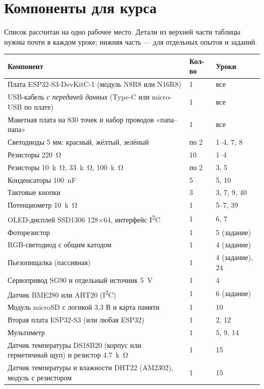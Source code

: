 \section{Компоненты для курса}
Список рассчитан на одно рабочее место. Детали из верхней части таблицы нужны почти в каждом уроке;
нижняя часть --- для отдельных опытов и заданий.

{\small
\begin{xltabular}{\textwidth}{@{}X l l@{}}
\toprule
Компонент & Кол-во & Уроки \\
\midrule
Плата ESP32-S3-DevKitC-1 (модуль N8R8 или N16R8) & 1 & все \\
USB-кабель \emph{с передачей данных} (Type-C или micro-USB по плате) & 1 & все \\
Макетная плата на 830 точек и набор проводов «папа--папа» & 1 & все \\
Светодиоды 5 мм: красный, жёлтый, зелёный & по 2 & 1--4, 7, 8 \\
Резисторы \SI{220}{\ohm} & 10 & 1--4 \\
Резисторы \SI{10}{k\ohm}, \SI{33}{k\ohm}, \SI{100}{k\ohm} & по 2 & 3, 5 \\
Конденсаторы \SI{100}{nF} & 5 & 5, 10 \\
Тактовые кнопки & 3 & 3, 7, 9, 40 \\
Потенциометр \SI{10}{k\ohm} & 1 & 5--7, 39 \\
OLED-дисплей SSD1306 128×64, интерфейс I\textsuperscript{2}C & 1 & 6, 7 \\
\midrule
Фоторезистор & 1 & 5 (задание) \\
RGB-светодиод с общим катодом & 1 & 4 (задание) \\
Пьезопищалка (пассивная) & 1 & 4 (задание), 24 \\
Сервопривод SG90 и отдельный источник \SI{5}{V} & 1 & 4 \\
Датчик BME280 или AHT20 (I\textsuperscript{2}C) & 1 & 6 (задание) \\
Модуль microSD с логикой 3,3 В и карта памяти & 1 & 10 \\
Вторая плата ESP32-S3 (или любая ESP32) & 1 & 2, 12 \\
Мультиметр & 1 & 5, 9, 14 \\
Датчик температуры DS18B20 (корпус или герметичный щуп) и резистор \SI{4.7}{k\ohm} & 1 & 15 \\
Датчик температуры и влажности DHT22 (AM2302), модуль с резистором & 1 & 15 \\

\end{xltabular}}
